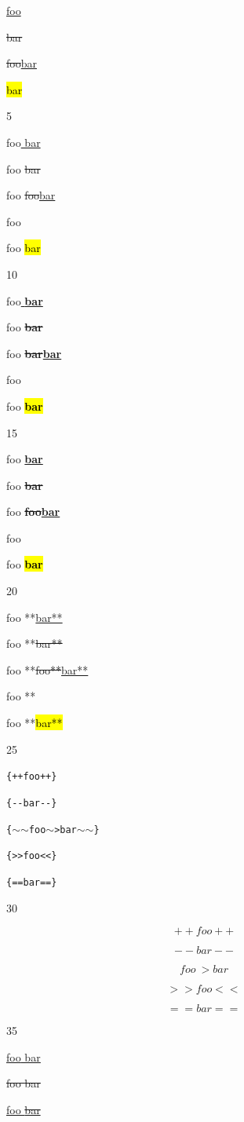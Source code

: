 
\def\mytitle{CriticMarkup}


\underline{foo}

\sout{bar}

\sout{foo}\underline{bar}


\hl{bar}

5

foo\underline{ bar}

foo\sout{ bar}

foo \sout{foo}\underline{bar}

foo 

foo \hl{bar}

10

foo\underline{ \textbf{bar}}

foo\sout{ \textbf{bar}}

foo \sout{\textbf{bar}}\underline{\textbf{bar}}

foo 

foo \hl{\textbf{bar}}

15

foo \textbf{\underline{bar}}

foo \textbf{\sout{bar}}

foo \textbf{\sout{foo}\underline{bar}}

foo \textbf{}

foo \textbf{\hl{bar}}

20

foo **\underline{bar**}

foo **\sout{bar**}

foo **\sout{foo**}\underline{bar**}

foo **

foo **\hl{bar**}

25

\texttt{\{++foo++\}}

\texttt{\{-{}-bar-{}-\}}

\texttt{\{\ensuremath{\sim}\ensuremath{\sim}foo\ensuremath{\sim}>bar\ensuremath{\sim}\ensuremath{\sim}\}}

\texttt{\{>>foo<<\}}

\texttt{\{==bar==\}}

30

$${++foo++}$$

$${--bar--}$$

$${~~foo~>bar~~}$$

$${>>foo<<}$$

$${==bar==}$$

35

\underline{foo\underline{ bar}}

\sout{foo\sout{ bar}}

\underline{foo\sout{ bar}}


